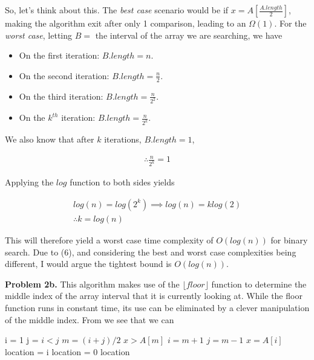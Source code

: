 \documentclass{article}
\begin{document}
So, let's think about this. The \emph{best case} scenario would be if $x = A[\frac{A.length}{2}]$, making the algorithm exit after only 1 comparison, leading to an $\Omega(1)$. For the \emph{worst case}, letting $B =$ the interval of the array we are searching, we have

\begin{itemize}
    \item On the first iteration: $B.length = n$.
    \item On the second iteration: $B.length = \frac{n}{2}$.
    \item On the third iteration: $B.length = \frac{n}{2^2}$.
    \item On the $k^{th}$ iteration: $B.length = \frac{n}{2^k}$.
\end{itemize}

We also know that after $k$ iterations, $B.length = 1$,

\begin{gather}
    \therefore \frac{n}{2^k} = 1
\end{gather}

Applying the $log$ function to both sides yields

\begin{gather}
    log(n) = log(2^k) \implies log(n) = klog(2) \\
    \therefore k = log(n)
\end{gather}

This will therefore yield a worst case time complexity of $O(log(n))$ for binary search. Due to (6), and considering the best and worst case complexities being different, I would argue the tightest bound is $O(log(n))$.

\hfill

\textbf{Problem 2b.} This algorithm makes use of the $\lfloor floor \rfloor$ function to determine the middle index of the array interval that it is currently looking at. While the floor function runs in constant time, its use can be eliminated by a clever manipulation of the middle index. From \cite{website:3} we see that we can

\begin{codebox}
    \li i = 1
    \li j = 
    \li \While $i < j$ \Do
    \li $m = (i + j)/2$
        \li \If $x > A[m]$
            \li \Then $i = m + 1$
            \li \Else $j = m - 1$
            \End
        \li \If $x = A[i]$
            \li \Then location = i
            \li \Else location = 0
            \End
        \End
    \li \Return location
\end{codebox}
\end{document}
